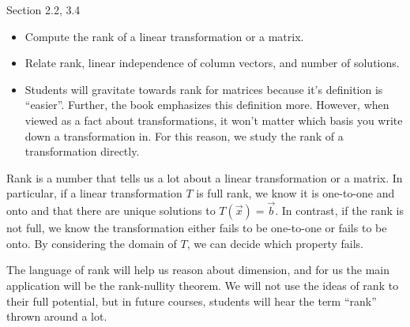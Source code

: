 \documentclass{problemset}
\newcommand{\bookonlynewpage}{\begin{bookonly}\newpage\end{bookonly}}
\begin{document}
\begin{lesson}

	Section 2.2, 3.4

	\begin{itemize}
		\item Compute the rank of a linear transformation or a matrix.
		\item Relate rank, linear independence of column vectors, and number of solutions.
	\end{itemize}

	\begin{annotation}
		\begin{notes}
			\begin{itemize}
				\item Students will gravitate towards rank for matrices because it's definition
					is ``easier''. Further, the book emphasizes this definition more. However,
					when viewed as a fact about transformations, it won't matter which
					basis you write down a transformation in. For this reason, we study the
					rank of a transformation directly.
			\end{itemize}
		\end{notes}
	\end{annotation}
	Rank is a number that tells us a lot about a linear transformation or a matrix. In particular,
	if a linear transformation $T$ is full rank, we know it is one-to-one and onto and that there are unique
	solutions to $T(\vec x)=\vec b$. In contrast, if the rank is not full, we know the transformation either fails to be
	one-to-one or fails to be onto. By considering the domain of $T$, we can decide which property fails.

	The language of rank will help us reason about dimension, and for us the main application will be the
	rank-nullity theorem. We will not use the ideas of rank to their full potential, but in
	future courses, students will hear the term ``rank'' thrown around a lot.

\end{lesson}
	\bookonlynewpage
\end{document}
